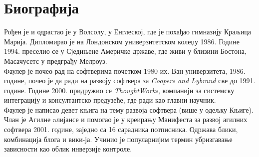 \documentclass[12pt,a4paper]{article}
\begin{document}
\section{{Биографија}}
\label{sec:biografija}
Рођен је и одрастао је у Волсолу, у Енглеској, где је похађао гимназију Краљица Марија. Дипломирао је на Лондонском универзитетском колеџу 1986. Године 1994. преселио се у Сједињене Америчке државе, где живи у близини Бостона, Масачусетс у предграђу Мелроуз\cite{sajt}.\\
Фаулер је почео рад на софтверима почетком 1980-их. Ван универзитета, 1986. године, почео је да ради на развоју софтвера за \emph{Coopers and Lybrand} све до 1991.\cite{k_3} године. Године 2000. придружио се \emph{ThoughtWorks}, компанији за системску интеграцију и консултантско предузеће\cite{sajt}, где ради као главни научник.\cite{sajt_2}\\
Фаулер је написао девет књига на тему развоја софтвера (више у одељку Књиге). Члан је Агилне aлијансе и помогао је у креирању Манифеста за развој агилних софтвера 2001. године, заједно са 16 сарадника потписника.\cite{sajt_3} Одржава блики, комбинација блога и вики-ја. Учинио је популарнијим термин убризгавање зависности као облик инверзије контроле. \cite{sajt_4, knjiga}


\newpage
\end{document}
